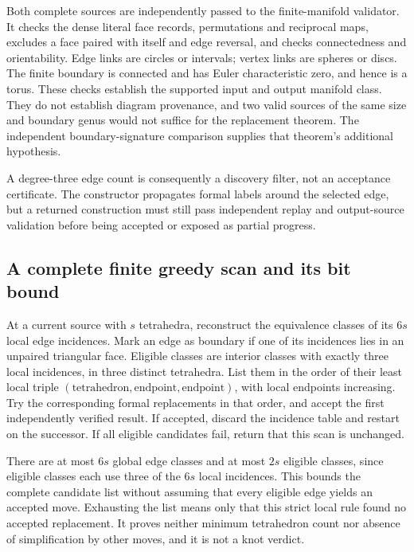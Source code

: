 Both complete sources are independently passed to the finite-manifold
validator.  It checks the dense literal face records, permutations and
reciprocal maps, excludes a face paired with itself and edge reversal,
and checks connectedness and orientability.  Edge links are circles or
intervals; vertex links are spheres or discs.  The finite boundary is
connected and has Euler characteristic zero, and hence is a torus.
These checks establish the supported input and output manifold class.
They do not establish diagram provenance, and two valid sources of the
same size and boundary genus would not suffice for the replacement theorem.
The independent boundary-signature comparison supplies that theorem's
additional hypothesis.

A degree-three edge count is consequently a discovery filter, not an
acceptance certificate.  The constructor propagates formal labels around
the selected edge, but a returned construction must still pass independent
replay and output-source validation before being accepted or exposed as
partial progress.

\subsection{A complete finite greedy scan and its bit bound}

At a current source with $s$ tetrahedra, reconstruct the equivalence
classes of its $6s$ local edge incidences.  Mark an edge as boundary if
one of its incidences lies in an unpaired triangular face.  Eligible
classes are interior classes with exactly three local incidences, in
three distinct tetrahedra.  List them in the order of their least local
triple $(\text{tetrahedron},\text{endpoint},\text{endpoint})$, with local
endpoints increasing.  Try the corresponding formal replacements in
that order, and accept the first independently verified result.  If
accepted, discard the incidence table and restart on the successor.
If all eligible candidates fail, return that this scan is unchanged.

There are at most $6s$ global edge classes and at most $2s$ eligible
classes, since eligible classes each use three of the $6s$ local
incidences.  This bounds the complete candidate list without assuming
that every eligible edge yields an accepted move.  Exhausting the list
means only that this strict local rule found no accepted replacement.
It proves neither minimum tetrahedron count nor absence of simplification
by other moves, and it is not a knot verdict.

